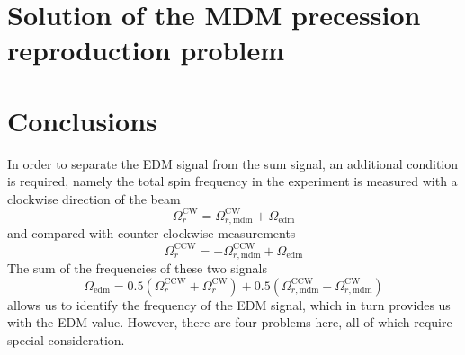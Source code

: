 \documentclass[a4paper]{jacow}
\begin{document}
\section{Solution of the MDM precession reproduction problem}

\section{Conclusions}

In order to separate
the EDM signal from the sum signal, an additional condition is required, namely the total spin frequency
in the experiment is measured with a clockwise direction of the beam 
\begin{equation}\label{eq:Omega CW}
\Omega_{r}^{\mathrm{CW}}=\Omega_{r,\mathrm{mdm}}^{\mathrm{CW}}+\Omega_{\mathrm{edm}}
\end{equation}  
and compared with  counter-clockwise measurements 
\begin{equation}\label{eq:Omega CCW}
\Omega_{r}^{\mathrm{CCW}}=-\Omega_{r,\mathrm{mdm}}^{\mathrm{CCW}}+\Omega_{\mathrm{edm}}
\end{equation}
The sum of the frequencies of these two signals 
\begin{equation}\label{eq:Omega CW_CCW}
\Omega_{\mathrm{edm}}=0.5\left(\Omega_{r}^{\mathrm{CCW}}+\Omega_{r}^{\mathrm{CW}}\right)+0.5\left(\Omega_{r,\mathrm{mdm}}^{\mathrm{CCW}}-\Omega_{r,\mathrm{mdm}}^{\mathrm{CW}}\right)
\end{equation}
allows us to identify the frequency of the EDM signal, which in turn provides us with the EDM value.
However, there are four problems here, all of which require special consideration.
 
\end{document}
